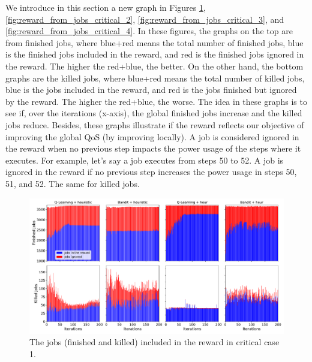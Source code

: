 We introduce in this section a new graph in Figures \ref{fig:reward_from_jobs_critical_1}, \ref{fig:reward_from_jobs_critical_2}, \ref{fig:reward_from_jobs_critical_3}, and \ref{fig:reward_from_jobs_critical_4}. In these figures, the graphs on the top are from finished jobs, where blue+red means the total number of finished jobs, blue is the finished jobs included in the reward, and red is the finished jobs ignored in the reward. The higher the red+blue, the better. On the other hand, the bottom graphs are the killed jobs, where blue+red means the total number of killed jobs, blue is the jobs included in the reward, and red is the jobs finished but ignored by the reward. The higher the red+blue, the worse. The idea in these graphs is to see if, over the iterations (x-axis), the global finished jobs increase and the killed jobs reduce. Besides, these graphs illustrate if the reward reflects our objective of improving the global QoS (by improving locally). A job is considered ignored in the reward when no previous step impacts the power usage of the steps where it executes. For example, let's say a job executes from steps 50 to 52. A job is ignored in the reward if no previous step increases the power usage in steps 50, 51, and 52. The same for killed jobs.

\begin{figure}[!htb]
    \centering
    \includegraphics[scale=0.33]{Images/Learning_compensations/ignored_jobs_touched_scenario_1.pdf}
    \caption{The  jobs (finished and killed) included in the reward in critical case 1.}
    \label{fig:reward_from_jobs_critical_1}
\end{figure}

